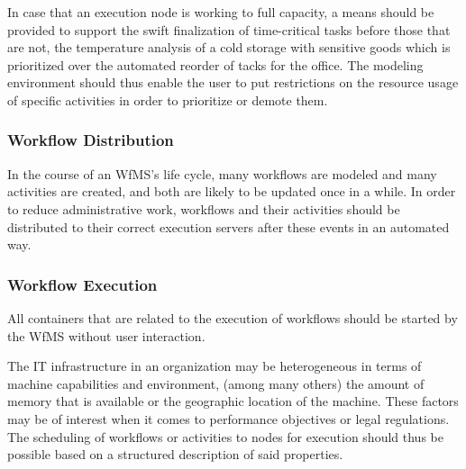 
      In case that an execution node is working to full capacity, a means should be provided to support the swift finalization of time-critical tasks before those that are not, \eg the temperature analysis of a cold storage with sensitive goods which is prioritized over the automated reorder of tacks for the office. The modeling environment should thus enable the user to put restrictions on the resource usage of specific activities in order to prioritize or demote them.


  \subsubsection{Workflow Distribution} %
    \label{ssub:workflow_distribution}
      In the course of an \ac{WfMS}'s life cycle, many workflows are modeled and many activities are created, and both are likely to be updated once in a while. In order to reduce administrative work, workflows and their activities should be distributed to their correct execution servers after these events in an automated way.


  \subsubsection{Workflow Execution} %
    \label{ssub:workflow_execution}
        All containers that are related to the execution of workflows should be started by the \ac{WfMS} without user interaction.

        The IT infrastructure in an organization may be heterogeneous in terms of machine capabilities and environment, \eg (among many others) the amount of memory that is available or the geographic location of the machine. These factors may be of interest when it comes to performance objectives or legal regulations. The scheduling of workflows or activities to nodes for execution should thus be possible based on a structured description of said properties.

